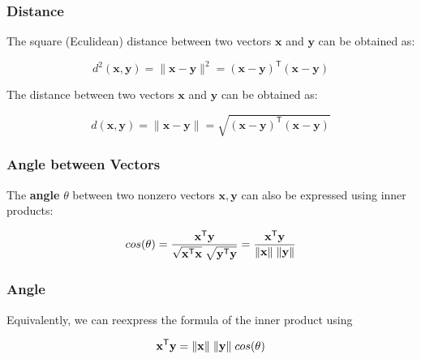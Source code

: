 \documentclass[12pt]{beamer}\usepackage[]{graphicx}\usepackage[]{color}
\begin{document}

\begin{frame}
\frametitle{Distance}

The square (Eculidean) distance between two vectors $\mathbf{x}$ and $\mathbf{y}$ 
can be obtained as:

{\large
$$
d^{2} (\mathbf{x}, \mathbf{y}) = \| \mathbf{x} - \mathbf{y} \|^2 = 
(\mathbf{x-y})^{\mathsf{T}}(\mathbf{x-y})
$$
}

\pause
\bigskip
The distance between two vectors $\mathbf{x}$ and $\mathbf{y}$ can be obtained as:

{\large
$$
d(\mathbf{x}, \mathbf{y}) = \| \mathbf{x} - \mathbf{y} \| = \sqrt{(\mathbf{x-y})^{\mathsf{T}}(\mathbf{x-y})}
$$
}

\end{frame}


\begin{frame}
\frametitle{Angle between Vectors}

The \textbf{angle} $\theta$ between two nonzero vectors 
$\mathbf{x, y}$ can also be expressed using inner products:

{\Large
$$
cos(\theta) = \frac{\mathbf{x^\mathsf{T} y}}{\sqrt{\mathbf{x^\mathsf{T} x}} \hspace{1mm} \sqrt{\mathbf{y^\mathsf{T} y}}}
= \frac{\mathbf{x^\mathsf{T} y}}{\| \mathbf{x} \| \hspace{1mm} \| \mathbf{y} \|}
$$
}

\end{frame}


\begin{frame}
\frametitle{Angle}

Equivalently, we can reexpress the formula of the inner product using 

{\Large
$$
\mathbf{x^\mathsf{T} y} = \| \mathbf{x} \| \hspace{1mm} \| \mathbf{y} \| \hspace{1mm} cos(\theta)
$$
}

\end{frame}

\end{document}
